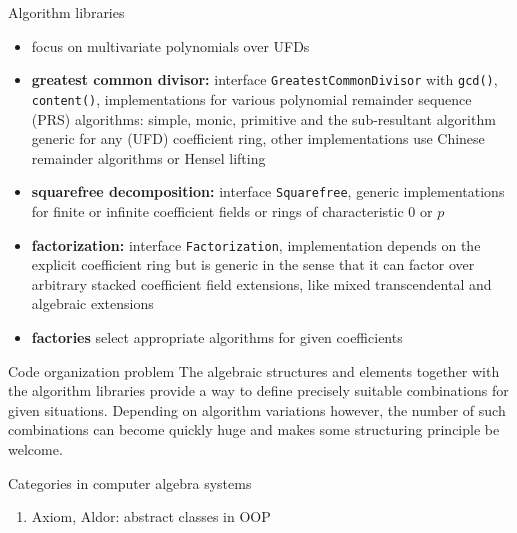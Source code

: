 \documentclass[final]{beamer}
\newcommand{\code}[1]{\texttt{#1}}
\begin{document}
\begin{frame}[fragile]
\begin{columns}[t]
\begin{column}{.3\linewidth}
  \begin{block}{\large Algorithm libraries}
  \scriptsize 
  \begin{itemize}
  \item focus on multivariate polynomials over UFDs
  \item \textbf{greatest common divisor:} 
        interface \code{Greatest\-Common\-Divisor} with \code{gcd()}, \code{content()}, 
        implementations for various polynomial remainder sequence (PRS) algorithms: 
        simple, monic, primitive and the sub-resultant algorithm 
        generic for any (UFD) coefficient ring,
        other implementations use Chinese remainder algorithms or Hensel lifting
  \item \textbf{squarefree decomposition:} 
        interface \code{Square\-free}, 
        generic implementations for finite or infinite coefficient fields 
        or rings of characteristic $0$ or $p$
  \item \textbf{factorization:} 
        interface \code{Factorization}, 
        implementation depends on the explicit coefficient ring 
        but is generic in the sense that it can factor
        over arbitrary stacked coefficient field extensions, like mixed
        transcendental and algebraic extensions
  \item \textbf{factories} select appropriate algorithms for given coefficients
  \end{itemize}
  \end{block}
  \hfill
  \begin{block}{\large Code organization problem}
  \scriptsize
The algebraic structures and elements together with the algorithm
libraries provide a way to define precisely suitable combinations
for given situations. Depending on algorithm variations however,
the number of such combinations can become quickly huge and makes
some structuring principle be welcome.
  \end{block}
  \hfill
  \begin{block}{\large Categories in computer algebra systems}
  \scriptsize
  \begin{enumerate}
  \item Axiom, Aldor: abstract classes in OOP
        \cite{JenksSutor:1992, Watt:2003}

\end{enumerate}
\end{block}
\end{column}
\end{columns}
\end{frame}
\end{document}
